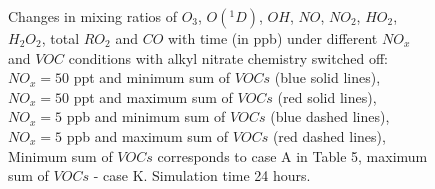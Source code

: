 \begin{figure}[h!]
\caption{Changes in mixing ratios of $O_3$, $O(^1D)$, $OH$, $NO$, $NO_2$, $HO_2$, $H_2O_2$, total $RO_2$ and $CO$ with time (in ppb) under different $NO_x$ and $VOC$ conditions with alkyl nitrate chemistry switched off: 
$NO_x=50$ ppt and minimum sum of $VOCs$ (blue solid lines), 
$NO_x=50$ ppt and maximum sum of $VOCs$ (red solid lines), 
$NO_x=5$ ppb and minimum sum of $VOCs$ (blue dashed lines),
$NO_x=5$ ppb and maximum sum of $VOCs$ (red dashed lines), Minimum sum of $VOCs$ corresponds to case A in Table 5, maximum sum of $VOCs$ - case K. Simulation time 24 hours.}
\label{fig:model_validation}
\end{figure}
